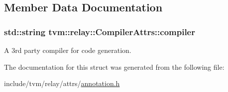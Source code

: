 \subsection{Member Data Documentation}
\subsubsection[{\texorpdfstring{compiler}{compiler}}]{\setlength{\rightskip}{0pt plus 5cm}std\+::string tvm\+::relay\+::\+Compiler\+Attrs\+::compiler}\hypertarget{structtvm_1_1relay_1_1CompilerAttrs_ae7f7c901a3dbe3b2a2150f8d197a3494}{}\label{structtvm_1_1relay_1_1CompilerAttrs_ae7f7c901a3dbe3b2a2150f8d197a3494}


A 3rd party compiler for code generation. 



The documentation for this struct was generated from the following file\+:\begin{DoxyCompactItemize}
\item 
include/tvm/relay/attrs/\hyperlink{annotation_8h}{annotation.\+h}\end{DoxyCompactItemize}
